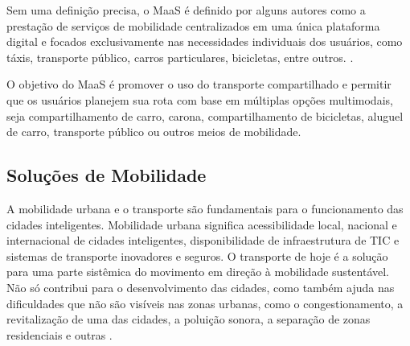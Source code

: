 Sem uma definição precisa, o MaaS é definido por alguns autores como a prestação de serviços de mobilidade centralizados em uma única plataforma digital e focados exclusivamente nas necessidades individuais dos usuários, como táxis, transporte público, carros particulares, bicicletas, entre outros. \cite{jittrapirom, kamargianni, mulley}.

O objetivo do MaaS é promover o uso do transporte compartilhado e permitir que os usuários planejem sua rota com base em múltiplas opções multimodais, seja compartilhamento de carro, carona, compartilhamento de bicicletas, aluguel de carro, transporte público ou outros meios de mobilidade.

\subsection{Soluções de Mobilidade}



A mobilidade urbana e o transporte são fundamentais para o funcionamento das cidades inteligentes. Mobilidade urbana significa acessibilidade local, nacional e internacional de cidades inteligentes, disponibilidade de infraestrutura de TIC e sistemas de transporte inovadores e seguros. O transporte de hoje é a solução para uma parte sistêmica do movimento em direção à mobilidade sustentável. Não só contribui para o desenvolvimento das cidades, como também ajuda nas dificuldades que não são visíveis nas zonas urbanas, como o congestionamento, a revitalização de uma das cidades, a poluição sonora, a separação de zonas residenciais e outras \cite{opitek} .

